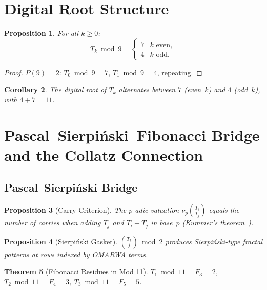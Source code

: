 \documentclass[11pt, a4paper]{article}
\theoremstyle{plain}
\newtheorem{theorem}{Theorem}[section]
\newtheorem{proposition}[theorem]{Proposition}
\newtheorem{corollary}[theorem]{Corollary}
\theoremstyle{definition}
\theoremstyle{remark}
\begin{document}
\section{Digital Root Structure}

\begin{proposition}\label{prop:dr}
For all $k \geq 0$:
\[
  T_k \bmod 9 = \begin{cases} 7 & k \text{ even}, \\ 4 & k \text{ odd}.
  \end{cases}
\]
\end{proposition}

\begin{proof}
$P(9) = 2$: $T_0 \bmod 9 = 7$, $T_1 \bmod 9 = 4$, repeating.
\end{proof}

\begin{corollary}\label{cor:dr}
The digital root of $T_k$ alternates between $7$ (even~$k$) and $4$
(odd~$k$), with $4 + 7 = 11$.
\end{corollary}

\section{Pascal--Sierpi\'nski--Fibonacci Bridge and the Collatz
  Connection}\label{sec:pascal}

\subsection{Pascal--Sierpi\'nski Bridge}

\begin{proposition}[Carry Criterion]\label{prop:kummer}
The $p$-adic valuation $\nu_p\binom{T_i}{T_j}$ equals the number of
carries when adding $T_j$ and $T_i - T_j$ in base~$p$
(Kummer's theorem~\cite{kummer}).
\end{proposition}

\begin{proposition}[Sierpi\'nski Gasket]\label{prop:sierpinski}
$\binom{T_k}{j} \bmod 2$ produces Sierpi\'nski-type fractal patterns
at rows indexed by OMARWA terms.
\end{proposition}

\begin{theorem}[Fibonacci Residues in Mod 11]\label{thm:fib-mod11}
$T_1 \bmod 11 = F_3 = 2$,\;
$T_2 \bmod 11 = F_4 = 3$,\;
$T_3 \bmod 11 = F_5 = 5$.
\end{theorem}
\end{document}
